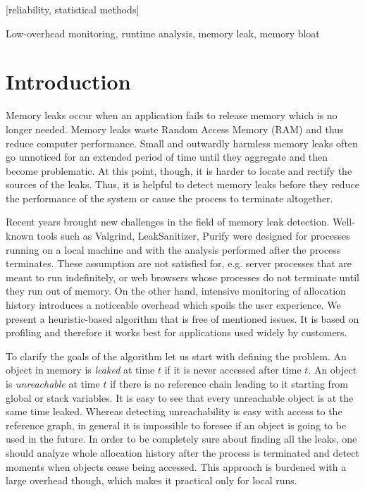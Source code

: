 \documentclass[preprint, numbers]{sigplanconf}
\begin{document}
[reliability, statistical methods]

\terms

\keywords
Low-overhead monitoring, runtime analysis, memory leak, memory bloat

\section{Introduction}

Memory leaks occur when an application fails to release memory which is no longer needed.
Memory leaks waste Random Access Memory (RAM) and thus reduce computer performance.
Small and outwardly harmless memory leaks often go unnoticed for an extended period
of time until they aggregate and then become problematic.
At this point, though, it is harder to locate and rectify the sources of the leaks.
Thus, it is helpful to detect memory leaks before they
reduce the performance of the system or cause the process to terminate altogether.

Recent years brought new challenges in the field of memory leak detection.
Well-known tools such as Valgrind, LeakSanitizer, Purify \cite{valgrind, leak-san, purify} were designed
for processes running on a local machine and with the analysis
performed after the process terminates.
These assumption are not satisfied for, e.g. server processes
that are meant to run indefinitely, or web browsers whose processes
do not terminate until they run out of memory.
On the other hand, intensive monitoring of allocation history
introduces a noticeable overhead which spoils the user experience.
We present a heuristic-based algorithm that is free of mentioned issues.
It is based on profiling and therefore it works best for applications used widely
by customers.

To clarify the goals of the algorithm let us start with defining the problem.
An object in memory is \textit{leaked} at time $t$ if it is never accessed
after time $t$.
An object is \textit{unreachable} at time $t$ if there is no reference chain
leading to it starting from global or stack variables.
It is easy to see that every unreachable object is at the same time leaked.
Whereas detecting unreachability is easy with access to the reference graph,
in general it is impossible to foresee if an object is going to be used in the future.
In order to be completely sure about finding all the leaks, one should analyze whole
allocation history after the process is terminated and detect moments when objects cease being accessed.
This approach is burdened with a large overhead though, which makes it practical only
for local runs.
\end{document}
